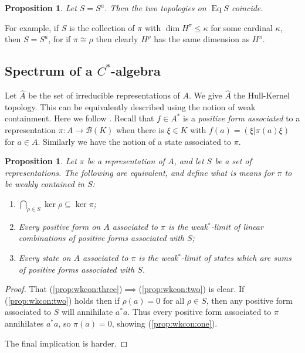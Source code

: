 \documentclass[a4paper,11pt]{article}
\newcommand{\mc}[1]{{\mathcal{#1}}}
\newcommand{\Eq}{\operatorname{Eq}}
\newtheorem{proposition}[lemma]{Proposition}
\begin{document}
\begin{proposition}\label{prop:uni_equiv_im_unique}
Let $S=S^u$.  Then the two topologies on $\Eq S$ coincide.
\end{proposition}

For example, if $S$ is the collection of $\pi$ with $\dim H^\pi \leq \kappa$
for some cardinal $\kappa$, then $S=S^u$, for if $\pi\cong\rho$ then clearly
$H^\rho$ has the same dimension as $H^\pi$.


\subsection{Spectrum of a $C^*$-algebra}

Let $\hat A$ be the set of irreducible representations of $A$.  We give
$\hat A$ the Hull-Kernel topology.  This can be equivalently described using
the notion of weak containment.  Here we follow \cite[Chapter~3.4]{dix}.
Recall that $f\in A^*$ is a \emph{positive form associated} to a representation
$\pi:A\rightarrow\mc B(K)$ when there is $\xi\in K$ with
$f(a) = (\xi|\pi(a)\xi)$ for $a\in A$.  Similarly we have the notion of
a state associated to $\pi$.

\begin{proposition}\label{prop:wkcon}
Let $\pi$ be a representation of $A$, and let $S$ be a set of representations.
The following are equivalent, and define what is means for $\pi$ to be
\emph{weakly contained} in $S$:
\begin{enumerate}
\item\label{prop:wkcon:one}
$\bigcap_{\rho\in S} \ker\rho \subseteq \ker\pi$;
\item\label{prop:wkcon:two}
Every positive form on $A$ associated to $\pi$ is the weak$^*$-limit
of linear combinations of positive forms associated with $S$;
\item\label{prop:wkcon:three}
Every state on $A$ associated to $\pi$ is the weak$^*$-limit
of states which are sums of positive forms associated with $S$.
\end{enumerate}
\end{proposition}
\begin{proof}
That (\ref{prop:wkcon:three})$\implies$(\ref{prop:wkcon:two}) is clear.
If (\ref{prop:wkcon:two}) holds then if $\rho(a)=0$ for all $\rho\in S$,
then any positive form associated to $S$ will annihilate $a^*a$.
Thus every positive form associated to $\pi$ annihilates $a^*a$, so
$\pi(a)=0$, showing (\ref{prop:wkcon:one}).

The final implication is harder.
\end{proof}
\end{document}
